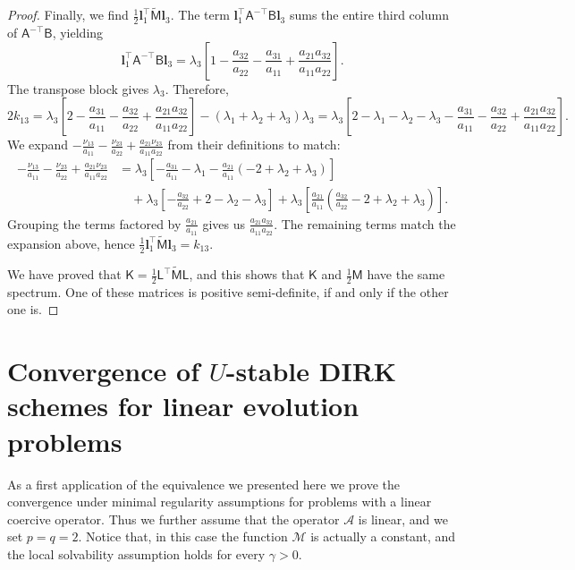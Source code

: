 \documentclass{amsart}
\newcommand{\msfA}{\mathsf{A}}
\newcommand{\msfB}{\mathsf{B}}
\newcommand{\msfM}{\mathsf{M}}
\newcommand{\msfK}{\mathsf{K}}
\newcommand{\msfL}{\mathsf{L}}
\newcommand{\mclA}{\mathcal{A}}
\newcommand{\mclM}{\mathcal{M}}
\newcommand{\bfl}{\boldsymbol{l}}
\theoremstyle{definition}
\newcommand{\AJS}[1]{#1}
\begin{document}
\begin{proof}
  Finally, we find $\frac{1}{2} \bfl_1^\top \tilde{\msfM} \bfl_3$. The term $\bfl_1^\top \msfA^{-\top} \msfB \bfl_3$ sums the entire third column of $\msfA^{-\top} \msfB$, yielding 
  \[
    \bfl_1^\top \msfA^{-\top} \msfB \bfl_3 = \lambda_3 \left[ 1 - \frac{a_{32}}{a_{22}} - \frac{a_{31}}{a_{11}} + \frac{a_{21}a_{32}}{a_{11}a_{22}} \right].
  \]
  The transpose block gives $\lambda_3$. Therefore,
  \[
    2 k_{13} = \lambda_3 \left[ 2 - \frac{a_{31}}{a_{11}} - \frac{a_{32}}{a_{22}} + \frac{a_{21}a_{32}}{a_{11}a_{22}} \right] - (\lambda_1+\lambda_2+\lambda_3)\lambda_3 
    = \lambda_3 \left[ 2 - \lambda_1 - \lambda_2 - \lambda_3 - \frac{a_{31}}{a_{11}} - \frac{a_{32}}{a_{22}} + \frac{a_{21}a_{32}}{a_{11}a_{22}} \right].
  \]
  We expand $-\frac{\nu_{13}}{a_{11}} - \frac{\nu_{23}}{a_{22}} + \frac{a_{21}\nu_{23}}{a_{11}a_{22}}$ from their definitions to match:
  \begin{align*}
    -\frac{\nu_{13}}{a_{11}} - \frac{\nu_{23}}{a_{22}} + \frac{a_{21}\nu_{23}}{a_{11}a_{22}} &= \lambda_3 \left[ -\frac{a_{31}}{a_{11}} - \lambda_1 - \frac{a_{21}}{a_{11}}(-2+\lambda_2+\lambda_3) \right] \\
    &\quad + \lambda_3 \left[ -\frac{a_{32}}{a_{22}} + 2 - \lambda_2 - \lambda_3 \right] + \lambda_3 \left[ \frac{a_{21}}{a_{11}}\left( \frac{a_{32}}{a_{22}} - 2 + \lambda_2 + \lambda_3 \right) \right].
  \end{align*}
  Grouping the terms factored by $\frac{a_{21}}{a_{11}}$ gives us $\frac{a_{21}a_{32}}{a_{11}a_{22}}$. The remaining terms match the expansion above, hence $\frac{1}{2} \bfl_1^\top \tilde{\msfM} \bfl_3 = k_{13}$.
  
  We have proved that $\msfK = \frac{1}{2} \msfL^\top \tilde{\msfM} \msfL$, and this shows that $\msfK$ and $\frac12\msfM$ have the same spectrum. One of these matrices is positive semi-definite, if and only if the other one is.
\end{proof}

\section{Convergence of $U$-stable DIRK schemes for linear evolution problems}
\label{sec:ConvLinear}

As a first application of the equivalence we presented here we prove the convergence under minimal regularity assumptions for problems with a linear coercive operator. Thus we further assume that the operator $\mclA$ is linear, and we set $p=q=2$. Notice that, in this case the function \AJS{$\mclM$} is actually a constant, and the local solvability assumption holds for every $\gamma>0$.
\end{document}
